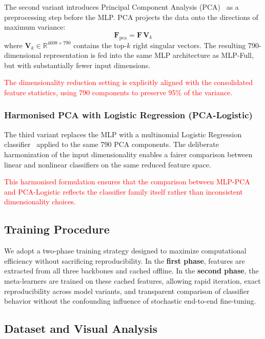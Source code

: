 \documentclass[pdflatex,sn-basic]{sn-jnl}
\begin{document}
The second variant introduces Principal Component Analysis (PCA)~\cite{jolliffe2002principal} as a preprocessing step before the MLP. PCA projects the data onto the directions of maximum variance:
\begin{equation}
    \mathbf{F}_{\text{pca}} = \mathbf{F}\,\mathbf{V}_k
    \label{eq:pca}
\end{equation}
where $\mathbf{V}_k \in \mathbb{R}^{4608 \times 790}$ contains the top-$k$ right singular vectors. The resulting 790-dimensional representation is fed into the same MLP architecture as MLP-Full, but with substantially fewer input dimensions.

\textcolor{red}{The dimensionality reduction setting is explicitly aligned with the consolidated feature statistics, using 790 components to preserve 95\% of the variance.}

\subsubsection{Harmonised PCA with Logistic Regression (PCA-Logistic)}
\label{subsubsec:pca_logistic}

The third variant replaces the MLP with a multinomial Logistic Regression classifier~\cite{bishop2006pattern} applied to the same 790 PCA components. The deliberate harmonization of the input dimensionality enables a fairer comparison between linear and nonlinear classifiers on the same reduced feature space.

\textcolor{red}{This harmonised formulation ensures that the comparison between MLP-PCA and PCA-Logistic reflects the classifier family itself rather than inconsistent dimensionality choices.}

\subsection{Training Procedure}
\label{subsec:training}

We adopt a two-phase training strategy designed to maximize computational efficiency without sacrificing reproducibility. In the \textbf{first phase}, features are extracted from all three backbones and cached offline. In the \textbf{second phase}, the meta-learners are trained on these cached features, allowing rapid iteration, exact reproducibility across model variants, and transparent comparison of classifier behavior without the confounding influence of stochastic end-to-end fine-tuning.

\subsection{Dataset and Visual Analysis}
\label{subsec:data_visualization}
\end{document}
